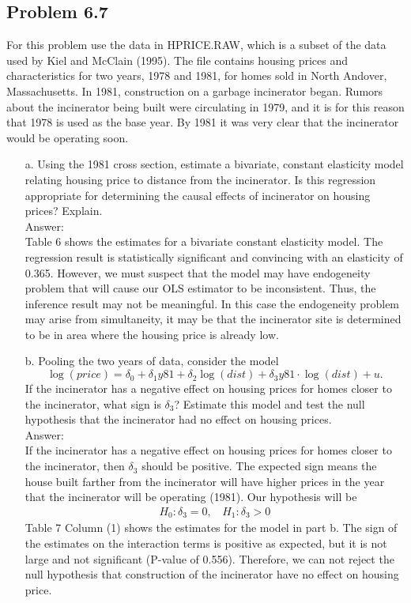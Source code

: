 \documentclass[10pt]{article}
\begin{document}
\subsection*{Problem 6.7}
For this problem use the data in HPRICE.RAW, which is a subset of the data used by Kiel and McClain (1995). The file contains housing prices and characteristics for two years, 1978 and 1981, for homes sold in North Andover, Massachusetts. In 1981, construction on a garbage incinerator began. Rumors about the incinerator being built were circulating in 1979, and it is for this reason that 1978 is used as the base year. By 1981 it was very clear that the incinerator would be operating soon.
\begin{enumerate}
\item[a.] Using the 1981 cross section, estimate a bivariate, constant elasticity model relating housing price to distance from the incinerator. Is this regression appropriate for determining the causal effects of incinerator on housing prices? Explain.
\\ Answer: \\
Table 6 shows the estimates for a bivariate constant elasticity model. The regression result is statistically significant and convincing with an elasticity of 0.365. However, we must suspect that the model may have endogeneity problem that will cause our OLS estimator to be inconsistent. Thus, the inference result may not be meaningful. In this case the endogeneity problem may arise from simultaneity, it may be that the incinerator site is determined to be in area where the housing price is already low.



\item[b.] Pooling the two years of data, consider the model
\[\log(price)=\delta_0+\delta_1y81+\delta_2\log(dist)+\delta_3y81\cdot \log(dist)+u.\]
If the incinerator has a negative effect on housing prices for homes closer to the incinerator, what sign is $\delta_3$? Estimate this model and test the null hypothesis that the incinerator had no effect on housing prices. 
\\ Answer:\\
If the incinerator has a negative effect on housing prices for homes closer to the incinerator, then $\delta_3$ should be positive. The expected sign means the house built farther from the incinerator will have higher prices in the year that the incinerator will be operating (1981). Our hypothesis will be
\begin{align*}
    H_0: \delta_3=0, \ \ \ \ H_1: \delta_3>0
\end{align*}
Table 7 Column (1) shows the estimates for the model in part b. The sign of the estimates on the interaction terms is positive as expected, but it is not large and not significant (P-value of 0.556). Therefore, we can not reject the null hypothesis that construction of the incinerator have no effect on housing price.


\end{enumerate}
\end{document}
